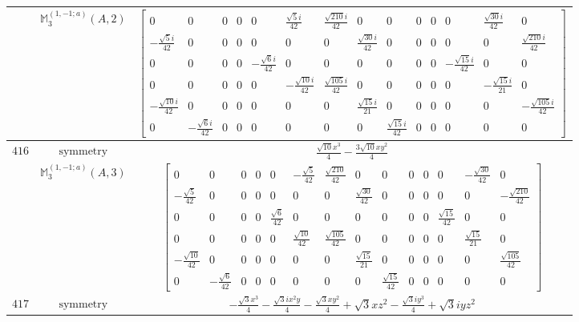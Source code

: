 \documentclass[fleqn,8pt,landscape]{jsarticle}
\begin{document}
\begin{longtable}{ccc}
$  $ & $ \mathbb{M}_{3}^{(1,-1;a)}(A,2) $ & $ \begin{bmatrix} 0 & 0 & 0 & 0 & 0 & \frac{\sqrt{5} i}{42} & \frac{\sqrt{210} i}{42} & 0 & 0 & 0 & 0 & 0 & \frac{\sqrt{30} i}{42} & 0 \\ - \frac{\sqrt{5} i}{42} & 0 & 0 & 0 & 0 & 0 & 0 & \frac{\sqrt{30} i}{42} & 0 & 0 & 0 & 0 & 0 & \frac{\sqrt{210} i}{42} \\ 0 & 0 & 0 & 0 & - \frac{\sqrt{6} i}{42} & 0 & 0 & 0 & 0 & 0 & 0 & - \frac{\sqrt{15} i}{42} & 0 & 0 \\ 0 & 0 & 0 & 0 & 0 & - \frac{\sqrt{10} i}{42} & \frac{\sqrt{105} i}{42} & 0 & 0 & 0 & 0 & 0 & - \frac{\sqrt{15} i}{21} & 0 \\ - \frac{\sqrt{10} i}{42} & 0 & 0 & 0 & 0 & 0 & 0 & \frac{\sqrt{15} i}{21} & 0 & 0 & 0 & 0 & 0 & - \frac{\sqrt{105} i}{42} \\ 0 & - \frac{\sqrt{6} i}{42} & 0 & 0 & 0 & 0 & 0 & 0 & \frac{\sqrt{15} i}{42} & 0 & 0 & 0 & 0 & 0 \end{bmatrix} $ \\ \hline
$ 416 $ & $ \text{symmetry} $ & $ \frac{\sqrt{10} x^{3}}{4} - \frac{3 \sqrt{10} x y^{2}}{4} $ \\
$  $ & $ \mathbb{M}_{3}^{(1,-1;a)}(A,3) $ & $ \begin{bmatrix} 0 & 0 & 0 & 0 & 0 & - \frac{\sqrt{5}}{42} & \frac{\sqrt{210}}{42} & 0 & 0 & 0 & 0 & 0 & - \frac{\sqrt{30}}{42} & 0 \\ - \frac{\sqrt{5}}{42} & 0 & 0 & 0 & 0 & 0 & 0 & \frac{\sqrt{30}}{42} & 0 & 0 & 0 & 0 & 0 & - \frac{\sqrt{210}}{42} \\ 0 & 0 & 0 & 0 & \frac{\sqrt{6}}{42} & 0 & 0 & 0 & 0 & 0 & 0 & \frac{\sqrt{15}}{42} & 0 & 0 \\ 0 & 0 & 0 & 0 & 0 & \frac{\sqrt{10}}{42} & \frac{\sqrt{105}}{42} & 0 & 0 & 0 & 0 & 0 & \frac{\sqrt{15}}{21} & 0 \\ - \frac{\sqrt{10}}{42} & 0 & 0 & 0 & 0 & 0 & 0 & \frac{\sqrt{15}}{21} & 0 & 0 & 0 & 0 & 0 & \frac{\sqrt{105}}{42} \\ 0 & - \frac{\sqrt{6}}{42} & 0 & 0 & 0 & 0 & 0 & 0 & \frac{\sqrt{15}}{42} & 0 & 0 & 0 & 0 & 0 \end{bmatrix} $ \\ \hline
$ 417 $ & $ \text{symmetry} $ & $ - \frac{\sqrt{3} x^{3}}{4} - \frac{\sqrt{3} i x^{2} y}{4} - \frac{\sqrt{3} x y^{2}}{4} + \sqrt{3} x z^{2} - \frac{\sqrt{3} i y^{3}}{4} + \sqrt{3} i y z^{2} $ \\

\end{longtable}
\end{document}
